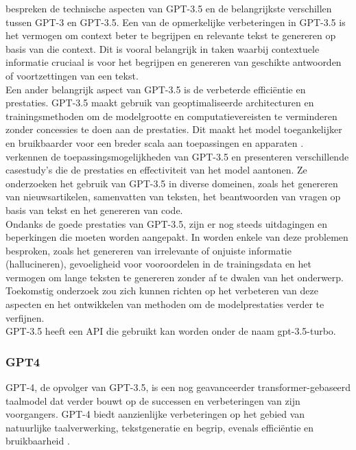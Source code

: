 \autocite{gpt_nappier} bespreken de technische aspecten van GPT-3.5 en de belangrijkste verschillen tussen GPT-3 en GPT-3.5. Een van de opmerkelijke verbeteringen in GPT-3.5 is het vermogen om context beter te begrijpen en relevante tekst te genereren op basis van die context. Dit is vooral belangrijk in taken waarbij contextuele informatie cruciaal is voor het begrijpen en genereren van geschikte antwoorden of voortzettingen van een tekst. \\

Een ander belangrijk aspect van GPT-3.5 is de verbeterde efficiëntie en prestaties. GPT-3.5 maakt gebruik van geoptimaliseerde architecturen en trainingsmethoden om de modelgrootte en computatievereisten te verminderen zonder concessies te doen aan de prestaties. Dit maakt het model toegankelijker en bruikbaarder voor een breder scala aan toepassingen en apparaten \autocite{gpt_nappier}. \\

\autocite{gpt_cn} verkennen de toepassingsmogelijkheden van GPT-3.5 en presenteren verschillende casestudy's die de prestaties en effectiviteit van het model aantonen. Ze onderzoeken het gebruik van GPT-3.5 in diverse domeinen, zoals het genereren van nieuwsartikelen, samenvatten van teksten, het beantwoorden van vragen op basis van tekst en het genereren van code. \\

Ondanks de goede prestaties van GPT-3.5, zijn er nog steeds uitdagingen en beperkingen die moeten worden aangepakt. In \autocite{gpt_cn} worden enkele van deze problemen besproken, zoals het genereren van irrelevante of onjuiste informatie (hallucineren), gevoeligheid voor vooroordelen in de trainingsdata en het vermogen om lange teksten te genereren zonder af te dwalen van het onderwerp. Toekomstig onderzoek zou zich kunnen richten op het verbeteren van deze aspecten en het ontwikkelen van methoden om de modelprestaties verder te verfijnen.\\

GPT-3.5 heeft een API die gebruikt kan worden onder de naam gpt-3.5-turbo. 

\subsubsection{GPT4}
GPT-4, de opvolger van GPT-3.5, is een nog geavanceerder transformer-gebaseerd taalmodel dat verder bouwt op de successen en verbeteringen van zijn voorgangers. GPT-4 biedt aanzienlijke verbeteringen op het gebied van natuurlijke taalverwerking, tekstgeneratie en begrip, evenals efficiëntie en bruikbaarheid \autocite{gpt_openai, gpt_micai}. \\

